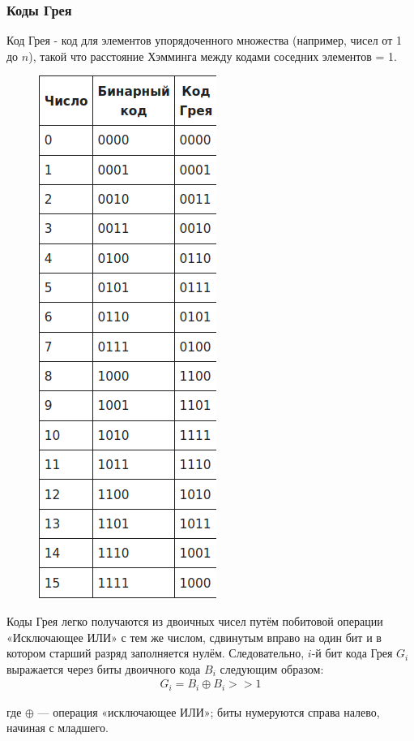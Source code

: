 \documentclass{article}
\begin{document}
\subsubsection{Коды Грея}
Код Грея - код для элементов упорядоченного множества (например, чисел от 1 до $n$), такой что расстояние Хэмминга между кодами соседних элементов = 1.
\begin{figure}[H]
	\centering
	\includegraphics[scale=0.4]{images/grey.png}
\end{figure}

Коды Грея легко получаются из двоичных чисел путём побитовой операции «Исключающее ИЛИ» с тем же числом, сдвинутым вправо на один бит и в котором старший разряд заполняется нулём. Следовательно, $i$-й бит кода Грея $G_i$ выражается через биты двоичного кода $B_i$ следующим образом:
\begin{align*}
G_i = B_i \oplus B_i >> 1
\end{align*}

где $\oplus$ — операция «исключающее ИЛИ»; биты нумеруются справа налево, начиная с младшего. 
\end{document}
